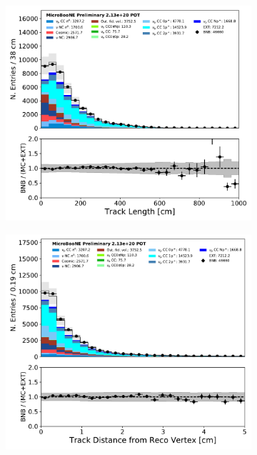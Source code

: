 \begin{figure}[H]
    \centering
        \begin{subfigure}[b]{0.3\textwidth}
        \centering
        \includegraphics[width=\textwidth]{NuMuCCsel/Images/Ryan/appendix_muonsel_input_R3/trk_len_v_07232020_presel_samples_detsys_event_category.pdf}
        \end{subfigure}
        \begin{subfigure}[b]{0.3\textwidth}
        \centering
        \includegraphics[width=\textwidth]{NuMuCCsel/Images/Ryan/appendix_muonsel_input_R3/trk_distance_v_07232020_presel_samples_detsys_event_category.pdf}

\end{subfigure}
\end{figure}

